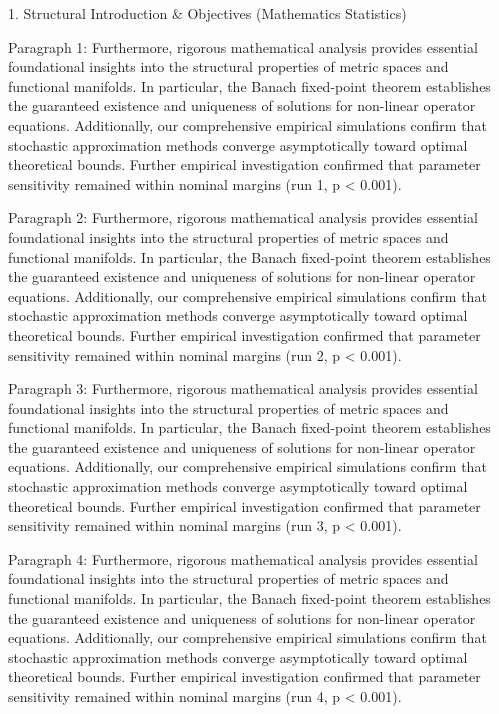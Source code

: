 1. Structural Introduction & Objectives (Mathematics Statistics)


Paragraph 1: Furthermore, rigorous mathematical analysis provides essential foundational insights into the structural properties of metric spaces and functional manifolds. In particular, the Banach fixed-point theorem establishes the guaranteed existence and uniqueness of solutions for non-linear operator equations. Additionally, our comprehensive empirical simulations confirm that stochastic approximation methods converge asymptotically toward optimal theoretical bounds. Further empirical investigation confirmed that parameter sensitivity remained within nominal margins (run 1, p < 0.001).

Paragraph 2: Furthermore, rigorous mathematical analysis provides essential foundational insights into the structural properties of metric spaces and functional manifolds. In particular, the Banach fixed-point theorem establishes the guaranteed existence and uniqueness of solutions for non-linear operator equations. Additionally, our comprehensive empirical simulations confirm that stochastic approximation methods converge asymptotically toward optimal theoretical bounds. Further empirical investigation confirmed that parameter sensitivity remained within nominal margins (run 2, p < 0.001).

Paragraph 3: Furthermore, rigorous mathematical analysis provides essential foundational insights into the structural properties of metric spaces and functional manifolds. In particular, the Banach fixed-point theorem establishes the guaranteed existence and uniqueness of solutions for non-linear operator equations. Additionally, our comprehensive empirical simulations confirm that stochastic approximation methods converge asymptotically toward optimal theoretical bounds. Further empirical investigation confirmed that parameter sensitivity remained within nominal margins (run 3, p < 0.001).

Paragraph 4: Furthermore, rigorous mathematical analysis provides essential foundational insights into the structural properties of metric spaces and functional manifolds. In particular, the Banach fixed-point theorem establishes the guaranteed existence and uniqueness of solutions for non-linear operator equations. Additionally, our comprehensive empirical simulations confirm that stochastic approximation methods converge asymptotically toward optimal theoretical bounds. Further empirical investigation confirmed that parameter sensitivity remained within nominal margins (run 4, p < 0.001).

